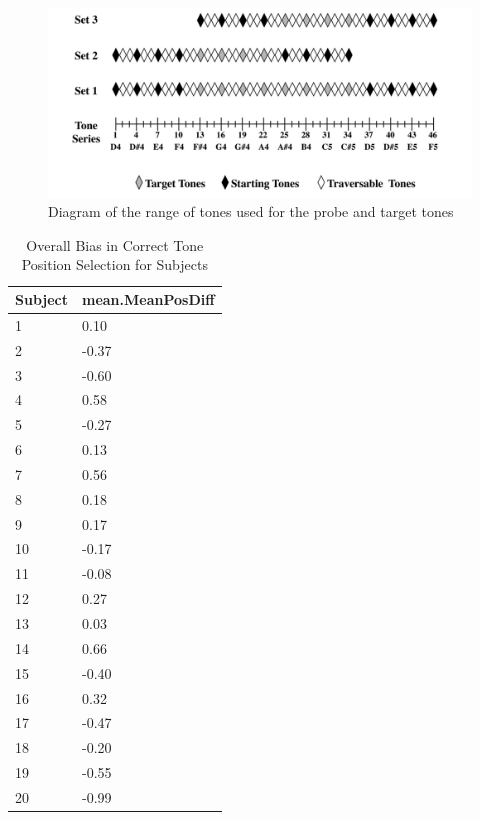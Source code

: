 \documentclass[
  man,floatsintext]{apa6}
\begin{document}
\begin{figure}
\centering
\includegraphics{tones.png}
\caption{\label{fig:fig-tonescale}Diagram of the range of tones used for the probe and target tones}
\end{figure}

\begin{table}[tbp]

\begin{center}
\begin{threeparttable}

\caption{\label{tab:table-MeanPosDiff}Overall Bias in Correct Tone Position Selection for Subjects}

\begin{tabular}{ll}
\toprule
Subject & \multicolumn{1}{c}{mean.MeanPosDiff}\\
\midrule
1 & 0.10\\
2 & -0.37\\
3 & -0.60\\
4 & 0.58\\
5 & -0.27\\
6 & 0.13\\
7 & 0.56\\
8 & 0.18\\
9 & 0.17\\
10 & -0.17\\
11 & -0.08\\
12 & 0.27\\
13 & 0.03\\
14 & 0.66\\
15 & -0.40\\
16 & 0.32\\
17 & -0.47\\
18 & -0.20\\
19 & -0.55\\
20 & -0.99\\
\bottomrule
\end{tabular}

\end{threeparttable}
\end{center}

\end{table}
\end{document}

